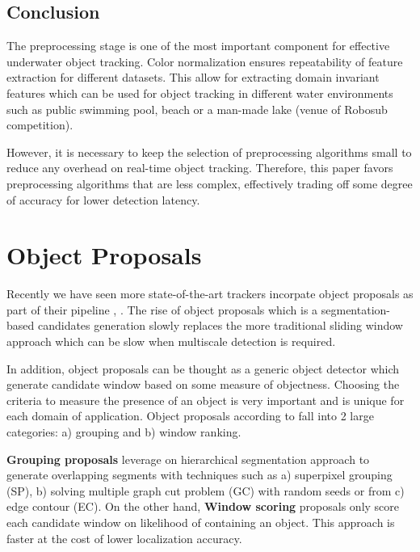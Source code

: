 \documentclass[fypca]{socreport}
\begin{document}
\section{Conclusion}

The preprocessing stage is one of the most important component for effective
underwater object tracking. Color normalization ensures repeatability of feature
extraction for different datasets. This allow for extracting domain invariant
features which can be used for object tracking in different water environments
such as public swimming pool, beach or a man-made lake (venue of Robosub competition).

However, it is necessary to keep the selection of preprocessing algorithms small
to reduce any overhead on real-time object tracking. Therefore, this paper
favors preprocessing algorithms that are less complex, effectively trading off
some degree of accuracy for lower detection latency.


\chapter{Object Proposals}

Recently we have seen more state-of-the-art trackers incorpate object proposals
as part of their pipeline , .
The rise of object proposals which is a segmentation-based candidates generation
slowly replaces the more traditional sliding window approach which can be slow
when multiscale detection is required.

In addition, object proposals can be thought as a generic object detector which
generate candidate window based on some measure of objectness. Choosing the
criteria to measure the presence of an object is very important and is unique
for each domain of application. Object proposals according to
 fall into 2 large categories: a) grouping and b)
window ranking. 

\textbf{Grouping proposals} leverage on hierarchical segmentation approach to
generate overlapping segments with techniques such as a) superpixel grouping
(SP), b) solving multiple graph cut problem (GC) with random seeds or from c)
edge contour (EC). On the other hand, \textbf{Window scoring} proposals only
score each candidate window on likelihood of containing an object. This approach
is faster at the cost of lower localization accuracy.
\end{document}
